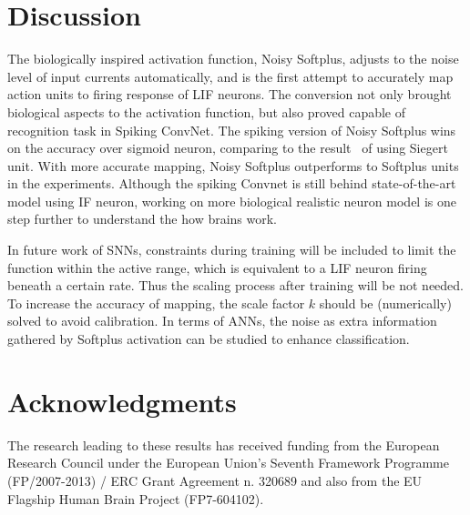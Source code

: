 \documentclass[runningheads,a4paper]{llncs}
\begin{document}
\section{Discussion}
The biologically inspired activation function, Noisy Softplus, adjusts to the noise level of input currents automatically, and is the first attempt to accurately map action units to firing response of LIF neurons.
The conversion not only brought biological aspects to the activation function, but also proved capable of recognition task in Spiking ConvNet.
The spiking version of Noisy Softplus wins on the accuracy over sigmoid neuron, comparing to the result~\cite{Stromatias2015scalable} of using Siegert unit.
With more accurate mapping, Noisy Softplus outperforms to Softplus units in the experiments.
Although the spiking Convnet is still behind state-of-the-art model using IF neuron, working on more biological realistic neuron model is one step further to understand the how brains work.

In future work of SNNs, constraints during training will be included to limit the function within the active range, which is equivalent to a LIF neuron firing beneath a certain rate.
Thus the scaling process after training will be not needed.
To increase the accuracy of mapping, the scale factor $k$ should be (numerically) solved to avoid calibration.
In terms of ANNs, the noise as extra information gathered by Softplus activation can be studied to enhance classification.


\section*{Acknowledgments}

The research leading to these results has received funding from the European Research Council under the European Union's Seventh Framework Programme (FP/2007-2013) / ERC Grant Agreement n. 320689 and also from the EU Flagship Human Brain Project (FP7-604102). 
\end{document}
